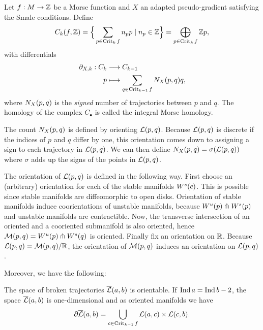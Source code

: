 \begin{definition}
    Let $f: M \to  \mathbb{Z}$ be a Morse function and $X$ an adapted pseudo-gradient satisfying the Smale conditions. Define
        \[
            C_k(f, \mathbb{Z}) = \Big\{ \sum_{p \in \operatorname{Crit}_k f} n_p p  \mid n_p \in \mathbb{Z} \Big\}  = \bigoplus_{p \in \operatorname{Crit}_k f} \mathbb{Z} p
        ,\] 
        with differentials
        \begin{align*}
            \partial_{X, k}: C_k &\longrightarrow C_{k-1} \\
            p &\longmapsto \sum_{q \in \operatorname{Crit}_{k-1} f} N_{X}(p, q) q
        ,\end{align*}
        where $N_{X}(p, q)$ is the \emph{signed} number of trajectories between  $p$ and $q$.
        The homology of the complex $C_\bullet$ is called the integral Morse homology.
\end{definition}

    The count $N_{X}(p, q)$ is defined by orienting  $\mathcal L(p, q)$.
    Because $\mathcal L(p, q)$ is discrete if the indices of $p$ and  $q$ differ by one, this orientation comes down to assigning a sign to each trajectory in  $\mathcal L(p, q)$. We can then define $N_{X}(p, q)  = \sigma(\mathcal L(p, q))$ where $\sigma$ adds up the signs of the points in $\mathcal L(p, q)$.

    The orientation of $\mathcal L(p, q)$ is defined in the following way.
    First choose an (arbitrary) orientation for each of the stable manifolds $W^s(c)$. This is possible since stable manifolds are diffeomorphic to open disks.
    Orientation of stable manifolds induce coorientations of unstable manifolds, because $W^u(p) \pitchfork W^s(p)$ and unstable manifolds are contractible.
    Now, the transverse intersection of an oriented and a cooriented submanifold is also oriented, hence $\mathcal M(p, q) = W^u(p) \pitchfork W^s(q)$ is oriented.
    Finally fix an orientation on $\mathbb{R}$.
    Because $\mathcal L(p, q) = \mathcal M(p, q) / \mathbb{R}$, the orientation of $\mathcal M(p, q)$ induces an orientation on  $\mathcal L(p, q)$.

Moreover, we have the following:
    \begin{prop}
        The space of broken trajectories $\overline{\mathcal L}(a, b)$ is orientable.
        If $\operatorname{Ind} a = \operatorname{Ind} b - 2$,  the space $\overline{\mathcal L}(a, b) $ is one-dimensional and as oriented manifolds we have
         \[
             \partial \overline{\mathcal L}(a, b) = \bigcup_{c \in \operatorname{Crit}_{k-1} f }  \mathcal L(a, c) \times  \mathcal L(c, b)
        .\] 
    \end{prop}
    

